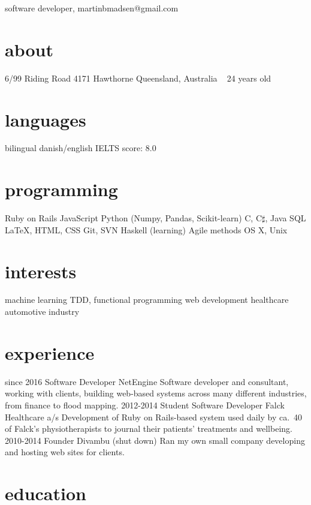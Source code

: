 \documentclass{afriggeri-cv/friggeri-cv}
\begin{document}
{software developer, martinbmadsen@gmail.com}

\begin{aside}
  \section{about}
    6/99 Riding Road
    4171 Hawthorne
    Queensland, Australia
    ~
    24 years old
  \section{languages}
    bilingual danish/english
    IELTS score: 8.0
  \section{programming}
    Ruby on Rails
    JavaScript
    Python (Numpy, Pandas, Scikit-learn)
    C, C$\sharp$, Java
    SQL
    \LaTeX, HTML, CSS
    Git, SVN
    Haskell (learning)
    Agile methods
    OS X, Unix
  \section{interests}
    machine learning
    TDD, functional programming
    web development
    healthcare
    automotive industry
\end{aside}

\section{experience}

\begin{entrylist}
  \entry%
    {since 2016}
    {Software Developer}
    {NetEngine}
    {Software developer and consultant, working with clients, building web-based systems across many
    different industries, from finance to flood mapping.}
  \entry%
    {2012-2014}
    {Student Software Developer}
    {Falck Healthcare a/s}
    {Development of Ruby on Rails-based system used daily by ca.\ 40 of Falck's physiotherapists to journal their patients' treatments and wellbeing.}
  \entry
    {2010-2014}
    {Founder}
    {Divambu (shut down)}
    {Ran my own small company developing and hosting web sites for clients.}
\end{entrylist}

\section{education}
\end{document}
